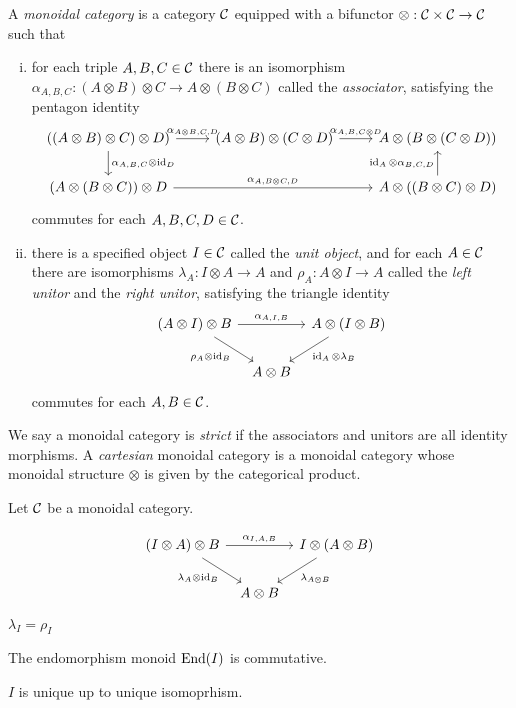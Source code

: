 \documentclass{../../large}
\begin{document}
\begin{prb}
A \emph{monoidal category} is a category $\mathcal{C}$ equipped with a bifunctor $\otimes:\mathcal{C}\times\mathcal{C}\to\mathcal{C}$ such that
\begin{enumerate}[(i)]
\item for each triple $A,B,C\in\mathcal{C}$ there is an isomorphism $\alpha_{A,B,C}:(A\otimes B)\otimes C\to A\otimes(B\otimes C)$ called the \emph{associator}, satisfying the pentagon identity
\[\begin{tikzcd}
((A\otimes B)\otimes C)\otimes D) \rar{\alpha_{A\otimes B,C,D}} \dar{\alpha_{A,B,C}\otimes\id_D} &
(A\otimes B)\otimes(C\otimes D) \rar{\alpha_{A,B,C\otimes D}} &
A\otimes(B\otimes(C\otimes D))\\
(A\otimes(B\otimes C))\otimes D \ar{rr}{\alpha_{A,B\otimes C,D}} &&
A\otimes((B\otimes C)\otimes D) \uar{\id_A\otimes\alpha_{B,C,D}}
\end{tikzcd}\]
commutes for each $A,B,C,D\in\mathcal{C}$.
\item there is a specified object $I\in\mathcal{C}$ called the \emph{unit object}, and for each $A\in\mathcal{C}$ there are isomorphisms $\lambda_A:I\otimes A\to A$ and $\rho_A:A\otimes I\to A$ called the \emph{left unitor} and the \emph{right unitor}, satisfying the triangle identity
\[\begin{tikzcd}[column sep=tiny]
(A\otimes I)\otimes B \ar{rr}{\alpha_{A,I,B}} \ar[swap]{dr}{\rho_A\otimes\id_B} &&
A\otimes(I\otimes B) \ar{dl}{\id_A\otimes\lambda_B}\\
& A\otimes B &
\end{tikzcd}\]
commutes for each $A,B\in\mathcal{C}$.
\end{enumerate}
We say a monoidal category is \emph{strict} if the associators and unitors are all identity morphisms.
A \emph{cartesian} monoidal category is a monoidal category whose monoidal structure $\otimes$ is given by the categorical product.
\end{prb}


\begin{prb}
Let $\mathcal{C}$ be a monoidal category.
\begin{parts}
\item
\[\begin{tikzcd}[column sep=tiny]
(I\otimes A)\otimes B \ar{rr}{\alpha_{I,A,B}} \ar[swap]{dr}{\lambda_A\otimes\id_B} &&
I\otimes(A\otimes B) \ar{dl}{\lambda_{A\otimes B}}\\
& A\otimes B &
\end{tikzcd}\]
\item $\lambda_I=\rho_I$
\item The endomorphism monoid $\operatorname{End}(I)$ is commutative.
\item $I$ is unique up to unique isomoprhism.
\end{parts}
\end{prb}
\end{document}
